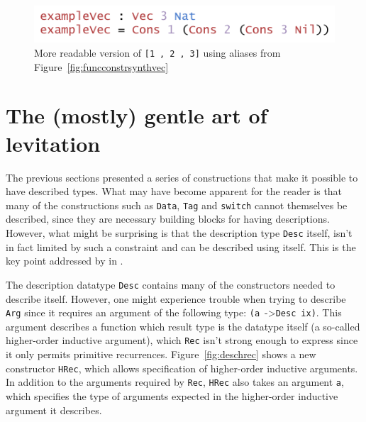\documentclass{ituthesis}
\newcommand{\ttconstructor}[1]{\textcolor{constructor-color}{\texttt{#1}}}
\newcommand{\tttype}[1]{\textcolor{type-color}{\texttt{#1}}}
\newcommand{\ttdec}[1]{\textcolor{declared-var-color}{\texttt{#1}}}
\newcommand{\ttvar}[1]{\textcolor{local-var-color}{\texttt{#1}}}
\newcommand{\ttliteral}[1]{\textcolor{literal-color}{\texttt{#1}}}
\theoremstyle{break}
\begin{document}
\begin{figure}[ht]
\begin{center}
    \includegraphics[scale=0.5]{Figures/VectorSynthesisedConstructorsExample.png}
\end{center}
\caption{More readable version of \ttconstructor{[}\ttliteral{1}~\ttconstructor{,}~\ttliteral{2}~\ttconstructor{,}~\ttliteral{3}\ttconstructor{]} using aliases from Figure~\ref{fig:funcconstrsynthvec}}
\label{fig:exmvecsynthvecdescconstrs}
\end{figure}

\section{The (mostly) gentle art of levitation}
\label{sec:TheMostlyGentleArtofLevitation}
The previous sections presented a series of constructions that make it possible to have described types.
What may have become apparent for the reader is that many of the constructions such as \tttype{Data}, \tttype{Tag} and \ttdec{switch} cannot themselves be described,
since they are necessary building blocks for having descriptions.
However, what might be surprising is that the description type \tttype{Desc} itself, isn't in fact limited by such a constraint
and can be described using itself.
This is the key point addressed by \textcite{Chapman:2010:GAL:1863543.1863547} in .

The description datatype \tttype{Desc} contains many of the constructors needed to describe itself.
However, one might experience trouble when trying to describe \ttconstructor{Arg} since it requires an argument of the following type:
\texttt{(}\ttvar{a}~->\tttype{Desc}~\ttvar{ix}\texttt{)}.
This argument describes a function which result type is the datatype itself (a so-called higher-order inductive argument), which \ttconstructor{Rec} isn't strong enough to express since it only permits primitive recurrences.
Figure~\ref{fig:deschrec} shows a new constructor \ttconstructor{HRec}, which allows specification of higher-order inductive arguments.
In addition to the arguments required by \ttconstructor{Rec}, \ttconstructor{HRec} also takes an argument \ttvar{a}, which specifies the type of arguments expected in the higher-order inductive argument it describes.
\end{document}
